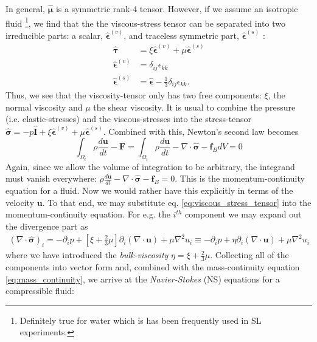 \documentclass[rmp,aps,nofootinbib,superscriptaddress,floatfix]{revtex4-2}
\begin{document}
In general, $\hat{\bm{\mu}}$ is a symmetric rank-4 tensor. However, if we assume an isotropic fluid \footnote{Definitely true for water which is has been frequently used in SL experiments.}, we find that the the viscous-stress tensor can be separated into two irreducible parts: a scalar, $\hat{\bm{\epsilon}}^{(v)}$, and traceless symmetric part, $\hat{\bm{\epsilon}}^{(s)}$ \cite{zee2016group,landau1987fluid}:
\begin{equation}
\begin{split}
    \hat{\bm{\tau}} & = \xi \hat{\bm{\epsilon}}^{(v)}+\mu \hat{\bm{\epsilon}}^{(s)} \\
    \hat{\bm{\epsilon}}^{(v)} & = \delta_{ij}\epsilon_{kk} \\
    \hat{\bm{\epsilon}}^{(s)} & = \hat{\bm{\epsilon}}-\frac{1}{3}\delta_{ij}\epsilon_{kk}.
    \label{eq:viscous_stress_tensor}
\end{split}
\end{equation}
Thus, we see that the viscosity-tensor only has two free components: $\xi$, the normal viscosity and $\mu$ the shear viscosity. It is usual to combine the pressure (i.e. elastic-stresses) and the viscous-stresses into the stress-tensor $\hat{\bm{\sigma}}=-p\hat{\bm{I}}+\xi \hat{\bm{\epsilon}}^{(v)}+\mu \hat{\bm{\epsilon}}^{(s)}$. Combined with this, Newton's second law becomes
\begin{equation}
    \int_{\Omega_t} \rho \frac{d \bm{u}}{dt}-\bm{F} = \int_{\Omega_t} \rho \frac{d \bm{u}}{dt} - \nabla \cdot \hat{\bm{\sigma}}-\bm{f}_B dV = 0
\end{equation}
Again, since we allow the volume of integration to be arbitrary, the integrand must vanish everywhere: $\rho \frac{d \bm{u}}{dt} - \nabla \cdot \hat{\bm{\sigma}}-\bm{f}_B=0$. This is the momentum-continuity equation for a fluid. Now we would rather have this explicitly in terms of the velocity $\bm{u}$. To that end, we may substitute eq. \ref{eq:viscous_stress_tensor} into the momentum-continuity equation. For e.g. the $i^{th}$ component we may expand out the divergence part as 
\begin{equation}
\begin{split}
    \left(\nabla \cdot \hat{\bm{\sigma}}\right)_i = -\partial_i p + \left[\xi +\frac{2}{3}\mu \right] \partial_i(\nabla \cdot \bm{u})+\mu \nabla^2 u_i \equiv -\partial_i p + \eta \partial_i(\nabla \cdot \bm{u})+\mu \nabla^2 u_i
\end{split}
\end{equation}
where we have introduced the \emph{bulk-viscosity} $\eta=\xi+\frac{2}{3}\mu$. Collecting all of the components into vector form and, combined with the mass-continuity equation \ref{eq:mass_continuity}, we arrive at the \emph{Navier-Stokes} (NS) equations for a compressible fluid:
\end{document}
